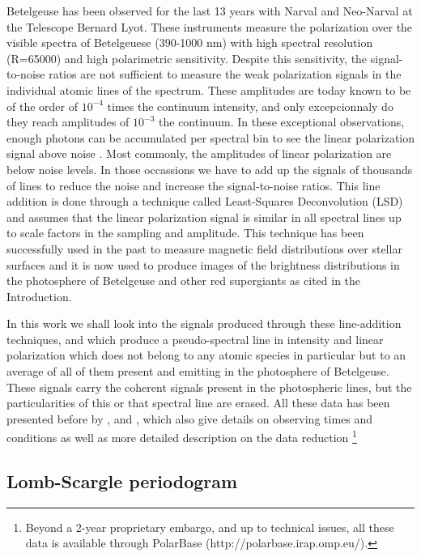 \documentclass{aa}
\begin{document}
Betelgeuse has been observed for the last 13 years with Narval and Neo-Narval at the Telescope Bernard Lyot. These instruments measure the polarization 
over the visible spectra of Betelgeuese (390-1000 nm) with high spectral resolution (R=65000) and high polarimetric sensitivity. Despite 
this sensitivity, the signal-to-noise ratios are not sufficient to measure the weak polarization signals in the individual atomic lines of the 
spectrum. These amplitudes are today known to be of the order of $10^{-4}$ times the continuum intensity, and only excepcionnaly do they 
reach amplitudes of $10^{-3}$ the continuum. In these exceptional observations, enough photons can be accumulated per spectral bin to 
see the linear polarization signal above noise \citep{auriere_discovery_2016}. Most commonly, the amplitudes of linear polarization are below noise levels. In those 
occassions we have to add up the signals of thousands of lines to reduce the noise and increase the signal-to-noise ratios. This line addition 
is done through a technique called Least-Squares Deconvolution (LSD) \citep{donati_spectropolarimetric_1997} and assumes that the 
linear polarization signal is similar 
in all spectral lines up to scale factors in the sampling and amplitude. This technique has been successfully used in the past to measure 
magnetic field distributions over stellar surfaces and it is now used to produce images of the brightness distributions in the photosphere 
of Betelgeuse and other red supergiants as cited in the Introduction. 

In this work we shall look into the signals produced through these line-addition techniques, and which produce a pseudo-spectral line in intensity 
and linear polarization which does not belong to any atomic species in particular but to an average of all of them present and emitting in the 
photosphere of Betelgeuse. These signals carry the coherent signals present in the photospheric lines, but the particularities of this or 
that spectral line are erased. All these data has been presented before by \cite{auriere_discovery_2016}, \cite{mathias_evolution_2018} and 
\cite{lopez_ariste_three-dimensional_2022}, which also give details on observing times and conditions as well as more detailed description 
on the data reduction \footnote[1]{Beyond a 2-year proprietary embargo, and up to technical issues, all these data is available through 
PolarBase (http://polarbase.irap.omp.eu/).}



\subsection{Lomb-Scargle periodogram}
\end{document}

